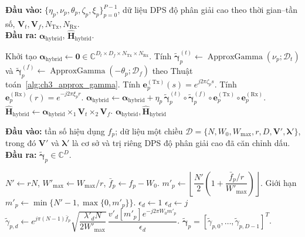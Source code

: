 \begin{algorithm}[H]
\caption{Phương pháp hybrid DPS thời gian--tần số}
\label{alg:ch3_hybrid}
\textbf{Đầu vào:} \(\{\eta_p,\nu_p,\theta_p,\zeta_p,\xi_p\}_{p=0}^{P-1}\), dữ liệu DPS độ phân giải cao theo thời gian--tần số, \(\mathbf{V}_t,\mathbf{V}_f,N_{\mathrm{Tx}},N_{\mathrm{Rx}}\).\\
\textbf{Đầu ra:} \(\boldsymbol{\alpha}_{\mathrm{hybrid}}\), \(\widehat{\mathbf{H}}_{\mathrm{hybrid}}\).
\begin{algorithmic}[1]
\State Khởi tạo \(\boldsymbol{\alpha}_{\mathrm{hybrid}}\gets\mathbf{0}\in
\mathbb{C}^{D_t\times D_f\times N_{\mathrm{Tx}}\times N_{\mathrm{Rx}}}\).
    \State Tính \(\widetilde{\boldsymbol{\gamma}}^{(t)}_p\gets\operatorname{ApproxGamma}(\nu_p;\mathcal{D}_t)\) và \(\widetilde{\boldsymbol{\gamma}}^{(f)}_p\gets\operatorname{ApproxGamma}(-\theta_p;\mathcal{D}_f)\) theo Thuật toán~\ref{alg:ch3_approx_gamma}.
    \State Tính \(\mathbf{e}^{(\mathrm{Tx})}_p(s)=e^{j2\pi\zeta_p s}\).
    \State Tính \(\mathbf{e}^{(\mathrm{Rx})}_p(r)=e^{-j2\pi\xi_p r}\).
    \State \(\boldsymbol{\alpha}_{\mathrm{hybrid}}\gets\boldsymbol{\alpha}_{\mathrm{hybrid}}+\eta_p\,
    \widetilde{\boldsymbol{\gamma}}^{(t)}_p
    \circ\widetilde{\boldsymbol{\gamma}}^{(f)}_p
    \circ\mathbf{e}^{(\mathrm{Tx})}_p
    \circ\mathbf{e}^{(\mathrm{Rx})}_p\).
\EndFor
\State \(\widehat{\mathbf{H}}_{\mathrm{hybrid}}\gets
\boldsymbol{\alpha}_{\mathrm{hybrid}}\times_1\mathbf{V}_t\times_2\mathbf{V}_f\).
\State \Return \(\boldsymbol{\alpha}_{\mathrm{hybrid}},\widehat{\mathbf{H}}_{\mathrm{hybrid}}\)
\end{algorithmic}
\end{algorithm}

\begin{algorithm}[H]
\caption{Ước lượng véc-tơ hệ số DPS một chiều}
\label{alg:ch3_approx_gamma}
\textbf{Đầu vào:} tần số hiệu dụng \(f_p\); dữ liệu một chiều \(\mathcal{D}=\{N,W_0,W_{\max},r,D,\mathbf{V}',\boldsymbol{\lambda}'\}\), trong đó \(\mathbf{V}'\) và \(\boldsymbol{\lambda}'\) là cơ sở và trị riêng DPS độ phân giải cao đã căn chỉnh dấu.\\
\textbf{Đầu ra:} \(\widetilde{\boldsymbol{\gamma}}_p\in\mathbb{C}^{D}\).
\begin{algorithmic}[1]
\State \(N'\gets rN\), \(W'_{\max}\gets W_{\max}/r\), \(\bar f_p\gets f_p-W_0\).
\State \(m'_p\gets\left\lfloor\dfrac{N'}{2}\left(1+\dfrac{\bar f_p/r}{W'_{\max}}\right)\right\rfloor\).
\State Giới hạn \(m'_p\gets\min\{N'-1,\max\{0,m'_p\}\}\).
        \State \(\epsilon_d\gets1\)
    \Else
        \State \(\epsilon_d\gets j\)
    \EndIf
    \State \(\widetilde{\gamma}_{p,d}\gets
    e^{j\pi(N-1)\bar f_p}
    \sqrt{\dfrac{\lambda'_dN}{2W'_{\max}}}\,
    \dfrac{v'_d[m'_p]e^{-j2\pi W_0m'_p}}{\epsilon_d}\).
\EndFor
\State \Return \(\widetilde{\boldsymbol{\gamma}}_p=[\widetilde{\gamma}_{p,0},\ldots,\widetilde{\gamma}_{p,D-1}]^T\).
\end{algorithmic}
\end{algorithm}

